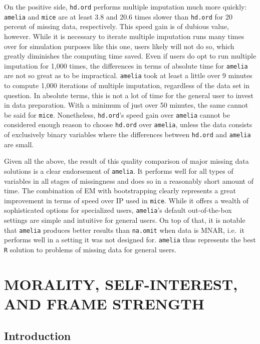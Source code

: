 \documentclass[12pt,econ]{sources/authesis}
\begin{document}
On the positive side, \texttt{hd.ord} performs multiple imputation much more quickly: \texttt{amelia} and \texttt{mice} are at least 3.8 and 20.6 times slower than \texttt{hd.ord} for 20 percent of missing data, respectively. This speed gain is of dubious value, however. While it is necessary to iterate multiple imputation runs many times over for simulation purposes like this one, users likely will not do so, which greatly diminishes the computing time saved. Even if users do opt to run multiple imputation for 1,000 times, the differences in terms of absolute time for \texttt{amelia} are not so great as to be impractical. \texttt{amelia} took at least a little over 9 minutes to compute 1,000 iterations of multiple imputation, regardless of the data set in question. In absolute terms, this is not a lot of time for the general user to invest in data preparation. With a minimum of just over 50 minutes, the same cannot be said for \texttt{mice}. Nonetheless, \texttt{hd.ord}'s speed gain over \texttt{amelia} cannot be considered enough reason to choose \texttt{hd.ord} over \texttt{amelia}, unless the data consists of exclusively binary variables where the differences between \texttt{hd.ord} and \texttt{amelia} are small.

Given all the above, the result of this quality comparison of major missing data solutions is a clear endorsement of \texttt{amelia}. It performs well for all types of variables in all stages of missingness and does so in a reasonably short amount of time. The combination of EM with bootstrapping clearly represents a great improvement in terms of speed over IP used in \texttt{mice}. While it offers a wealth of sophisticated options for specialized users, \texttt{amelia}'s default out-of-the-box settings are simple and intuitive for general users. On top of that, it is notable that \texttt{amelia} produces better results than \texttt{na.omit} when data is MNAR, i.e.~it performs well in a setting it was not designed for. \texttt{amelia} thus represents the best \texttt{R} solution to problems of missing data for general users.

\hypertarget{framing}{%
\chapter{MORALITY, SELF-INTEREST, AND FRAME STRENGTH}\label{framing}}

\hypertarget{framing-intro}{%
\section{Introduction}\label{framing-intro}}
\end{document}
